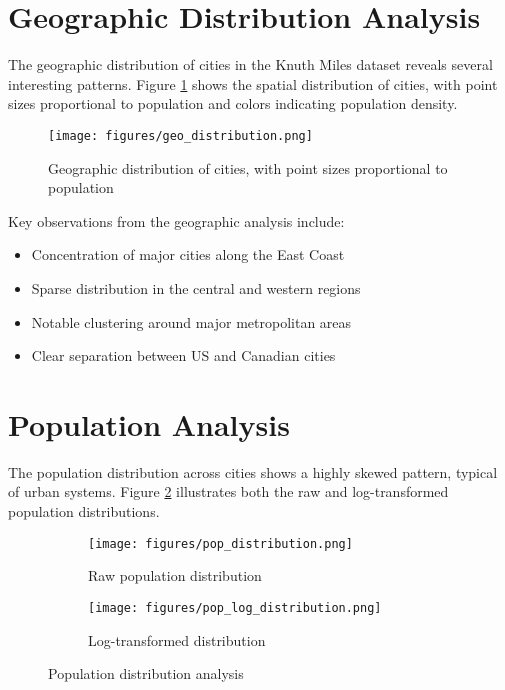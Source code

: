 \section{Geographic Distribution Analysis}
The geographic distribution of cities in the Knuth Miles dataset reveals several interesting patterns. Figure \ref{fig:geo_dist} shows the spatial distribution of cities, with point sizes proportional to population and colors indicating population density.

\begin{figure}[H]
    \centering
    \texttt{[image: figures/geo\_distribution.png]}
    \caption{Geographic distribution of cities, with point sizes proportional to population}
    \label{fig:geo_dist}
\end{figure}

Key observations from the geographic analysis include:
\begin{itemize}
    \item Concentration of major cities along the East Coast
    \item Sparse distribution in the central and western regions
    \item Notable clustering around major metropolitan areas
    \item Clear separation between US and Canadian cities
\end{itemize}

\section{Population Analysis}
The population distribution across cities shows a highly skewed pattern, typical of urban systems. Figure \ref{fig:pop_dist} illustrates both the raw and log-transformed population distributions.

\begin{figure}[H]
    \centering
    \begin{subfigure}[b]{0.48\textwidth}
        \texttt{[image: figures/pop\_distribution.png]}
        \caption{Raw population distribution}
    \end{subfigure}
    \begin{subfigure}[b]{0.48\textwidth}
        \texttt{[image: figures/pop\_log\_distribution.png]}
        \caption{Log-transformed distribution}
    \end{subfigure}
    \caption{Population distribution analysis}
    \label{fig:pop_dist}
\end{figure}

